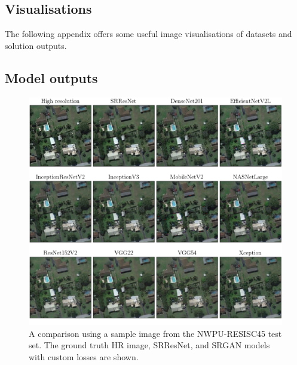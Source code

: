 \begin{appendices}
\chapter{Visualisations}
The following appendix offers some useful image visualisations of datasets and solution outputs.

\section{Model outputs}
\begin{figure}[H]
    \centering
    \includegraphics[width=\linewidth]{./assets/model_comparison.png}
    \caption{A comparison using a sample image from the NWPU-RESISC45 test set. The ground truth HR image, SRResNet, and SRGAN models with custom losses are shown.}
    \label{fig:model_comparison}
\end{figure}



\end{appendices}
